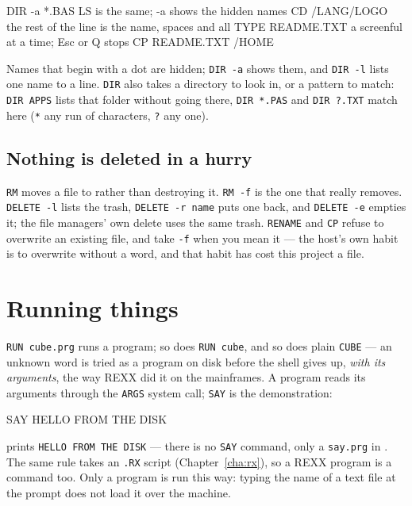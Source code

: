 \begin{type}
DIR -a *.BAS        LS is the same; -a shows the hidden names
CD /LANG/LOGO       the rest of the line is the name, spaces and all
TYPE README.TXT     a screenful at a time; Esc or Q stops
CP README.TXT /HOME
\end{type}

Names that begin with a dot are hidden; \verb|DIR -a| shows them, and
\verb|DIR -l| lists one name to a line. \verb|DIR| also takes a
directory to look in, or a pattern to match: \verb|DIR APPS| lists that
folder without going there, \verb|DIR *.PAS| and \verb|DIR ?.TXT| match
here (\verb|*| any run of characters, \verb|?| any one).


\subsection*{Nothing is deleted in a hurry}
\verb|RM| moves a file to  rather than destroying it.
\verb|RM -f| is the one that really removes. \verb|DELETE -l| lists the
trash, \verb|DELETE -r name| puts one back, and \verb|DELETE -e| empties
it; the file managers' own delete uses the same trash.
\verb|RENAME| and \verb|CP| refuse to overwrite an existing file, and
take \verb|-f| when you mean it --- the host's own habit is to overwrite
without a word, and that habit has cost this project a file.

\section{Running things}
\verb|RUN cube.prg| runs a program; so does \verb|RUN cube|, and so does
plain \verb|CUBE| --- an unknown word is tried as a program on disk before
the shell gives up, \emph{with its arguments}, the way REXX did it on the
mainframes. A program reads its arguments through the \texttt{ARGS} system
call; \verb|SAY| is the demonstration:

\begin{type}
SAY HELLO FROM THE DISK
\end{type}

prints \texttt{HELLO FROM THE DISK} --- there is no \texttt{SAY} command,
only a \texttt{say.prg} in . The same rule takes an
\texttt{.RX} script (Chapter~\ref{cha:rx}), so a REXX program is a
command too. Only a program is run this way: typing the name of a text
file at the prompt does not load it over the machine.

